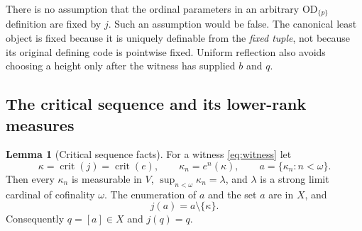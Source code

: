 \documentclass[11pt,letterpaper]{article}
\theoremstyle{definition}
\newtheorem{lemma}[definition]{Lemma}
\numberwithin{equation}{section}
\newcommand{\OD}{\mathrm{OD}}
\newcommand{\crit}{\operatorname{crit}}
\newcommand{\ODp}{\OD_{\{p\}}}
\begin{document}
There is no assumption that the ordinal parameters in an arbitrary
$\ODp$ definition are fixed by $j$. Such an assumption would be false.
The canonical least object is fixed because it is uniquely definable
from the \emph{fixed tuple}, not because its original defining code is
pointwise fixed. Uniform reflection also avoids choosing a height only
after the witness has supplied $b$ and $q$.

\subsection{The critical sequence and its lower-rank measures}

\begin{lemma}[Critical sequence facts]\label{lem:critical}
For a witness \eqref{eq:witness} let
\[
 \kappa=\crit(j)=\crit(e),\qquad
 \kappa_n=e^n(\kappa),\qquad a=\{\kappa_n:n<\omega\}.
\]
Then every $\kappa_n$ is measurable in $V$,
$\sup_{n<\omega}\kappa_n=\lambda$, and $\lambda$ is a strong limit
cardinal of cofinality $\omega$. The enumeration of $a$ and the set $a$
are in $X$, and
\[
 j(a)=a\setminus\{\kappa\}.
\]
Consequently $q=[a]\in X$ and $j(q)=q$.
\end{lemma}
\end{document}
